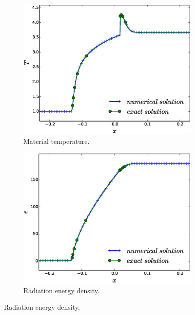 \documentclass[times,doublespace]{fldauth}%
\begin{document}
%
\begin{figure}[h]
    \centering
    \begin{subfigure}{0.49\textwidth}
    \includegraphics[width=\linewidth]{figures/dpt-xs/mass-diff-mat-temp-nel-2700-plot.eps}
    \caption{Material temperature.}\label{fig:mach-3-dpt-xs-mat-temp}
    \end{subfigure}
%
    \begin{subfigure}{0.49\textwidth}
    \includegraphics[width=\linewidth]{figures/dpt-xs/mass-diff-radiation-nel-2700-plot.eps}
    \caption{Radiation energy density.}\label{fig:mach-3-dpt-xs-rad-temp}
    \end{subfigure}

\end{figure}
\end{document}
